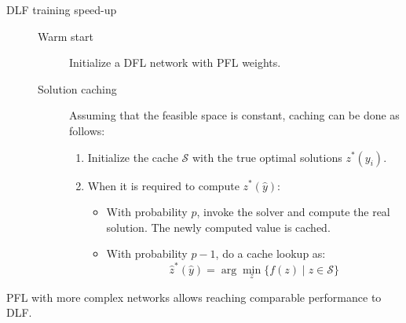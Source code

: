 \begin{description}
        \begin{description}
            \item[DLF training speed-up] \phantom{}
            \begin{description}
                \item[Warm start] 
                    Initialize a DFL network with PFL weights.
    
                \item[Solution caching] 
                    Assuming that the feasible space is constant, caching can be done as follows:
                    \begin{enumerate}
                        \item Initialize the cache $\mathcal{S}$ with the true optimal solutions $z^*(y_i)$.
                        \item When it is required to compute $z^*(\hat{y})$:
                        \begin{itemize}
                            \item With probability $p$, invoke the solver and compute the real solution. The newly computed value is cached.
                            \item With probability $p-1$, do a cache lookup as:
                            \[ \hat{z}^*(\hat{y}) = \arg\min_z \{ f(z) \mid z \in \mathcal{S} \} \]
                        \end{itemize}
                    \end{enumerate}
            \end{description}
        \end{description}
\end{description}

\begin{remark}
    PFL with more complex networks allows reaching comparable performance to DLF.
\end{remark}